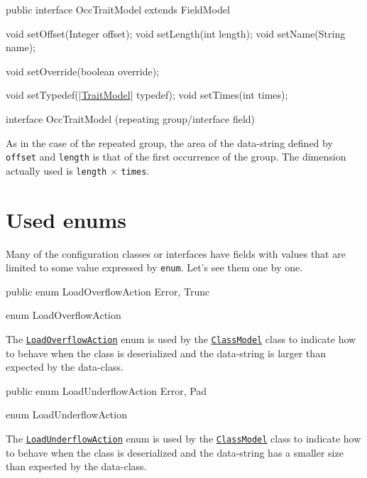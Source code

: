 \documentclass[a4paper,10pt]{report}
\newenvironment{elisting}[1][H]
  {\captionsetup{aboveskip=0pt}\begin{listing}[#1]}
  {\end{listing}%
}
\begin{document}
\begin{elisting}[!htb]
\begin{javacode}
public interface OccTraitModel extends FieldModel {
    void setOffset(Integer offset);
    void setLength(int length);
    void setName(String name);
    
    void setOverride(boolean override);
    
    void setTypedef(|\hyperref[lst:TraitModel]{TraitModel}| typedef);
    void setTimes(int times);
}
\end{javacode}
\caption{interface OccTraitModel (repeating group/interface field)}
\label{lst:OccTraitModel}
\end{elisting}

As in the case of the repeated group, the area of the data-string defined by 
\verb!offset! and \verb!length! is that of the first occurrence of the group. 
The dimension actually used is \verb!length! $\times$ \verb!times!.

\vspace*{5cm}

\chapter{Used enums}
Many of the configuration classes or interfaces have fields with values that are 
limited to some value expressed by \texttt{enum}. 
Let's see them one by one.

\begin{elisting}
\begin{javacode}
public enum LoadOverflowAction { Error, Trunc }
\end{javacode}
\caption{enum LoadOverflowAction}\label{lst:LoadOverflowAction}
\end{elisting}
The \hyperref[lst:LoadOverflowAction]{\texttt{LoadOverflowAction}} enum is used 
by the \hyperref[lst:ClassModel]{\texttt{ClassModel}} class to indicate how to 
behave when the class is deserialized and the data-string is larger than 
expected by the data-class.

\begin{elisting}
\begin{javacode}
public enum LoadUnderflowAction { Error, Pad }
\end{javacode}
\caption{enum LoadUnderflowAction}\label{lst:LoadUnderflowAction}
\end{elisting}
The \hyperref[lst:LoadUnderflowAction]{\texttt{LoadUnderflowAction}} enum is 
used by the \hyperref[lst:ClassModel]{\texttt{ClassModel}} class to indicate how 
to behave when the class is deserialized and the data-string has a smaller size 
than expected by the data-class.
\end{document}
